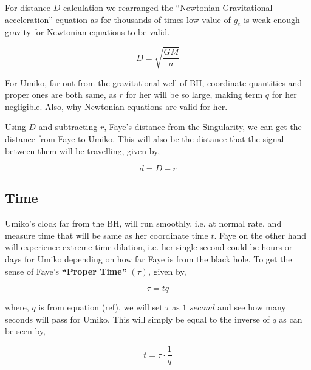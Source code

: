 \documentclass[9pt,a4paper,twocolumn,twoside]{tau-class/tau}
\begin{document}
      For distance \(D\) calculation we rearranged the ``Newtonian Gravitational acceleration'' equation as for thousands of times low value of \(g_e\) is weak enough gravity for Newtonian equations to be valid.

      \begin{equation}
        \boxed{D = \sqrt{\frac{GM}{a}}}
      \end{equation}

      \begin{info}
        For Umiko, far out from the gravitational well of BH, coordinate quantities and proper ones are both same, as \(r\) for her will be so large, making term \(q\) for her negligible. Also, why Newtonian equations are valid for her.
      \end{info}

      Using \(D\) and subtracting \(r\), Faye's distance from the Singularity, we can get the distance from Faye to Umiko. This will also be the distance that the signal between them will be travelling, given by, 

      \begin{equation}
        \boxed{d = D - r}
      \end{equation}

      \subsection{Time}

      Umiko's clock far from the BH, will run smoothly, i.e. at normal rate, and measure time that will be same as her coordinate time \(t\). Faye on the other hand will experience extreme time dilation, i.e. her single second could be hours or days for Umiko depending on how far Faye is from the black hole. To get the sense of Faye's \textbf{``Proper Time''} \((\tau)\), given by, 
      
      \begin{equation} \label{eq: tau1}
        \boxed{\tau = t q}
      \end{equation}

      where, \(q\) is from equation (ref), we will set \(\tau\) as \(1 \) \(second\) and see how many seconds will pass for Umiko. This will simply be equal to the inverse of \(q\) as can be seen by,

      \begin{equation}
        \boxed{t = \tau \cdot \frac{1}{q}}
      \end{equation}
\end{document}
